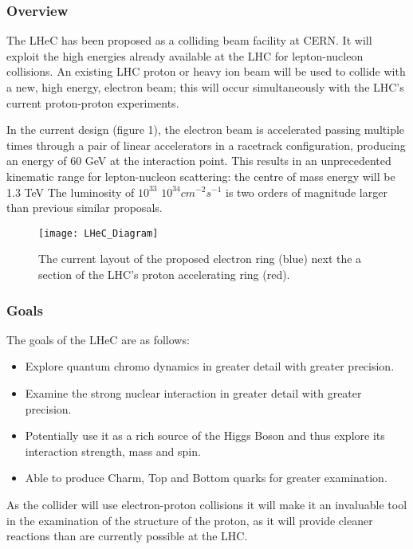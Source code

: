 \subsubsection{Overview \cite{LHeC:Birmingham}}

The LHeC has been proposed as a colliding beam facility at CERN. It will exploit the high energies already available at the LHC for lepton-nucleon collisions. An existing LHC proton or heavy ion beam will be used to collide with a new, high energy, electron beam; this will occur simultaneously with the LHC’s current proton-proton experiments.
 
In the current design (figure 1), the electron beam is accelerated passing multiple times through a pair of linear accelerators in a racetrack configuration, producing an energy of 60 GeV at the interaction point. This results in an unprecedented kinematic range for lepton-nucleon scattering: the centre of mass energy will be 1.3 TeV The luminosity of $10^{33}$ \textemdash $10^{34} cm^{-2}s^{-1}$ is two orders of magnitude larger than previous similar proposals.

\begin{figure}[!htb]
\centering
\texttt{[image: LHeC\_Diagram]}
\caption{The current layout of the proposed electron ring (blue) next the a section of the LHC’s proton accelerating ring (red).
}
\end{figure}

\subsubsection{Goals}

The goals of the LHeC are as follows:
\begin{itemize}
\item Explore quantum chromo dynamics in greater detail with greater precision.
\item Examine the strong nuclear interaction in greater detail with greater precision.
\item Potentially use it as a rich source of the Higgs Boson and thus explore its interaction strength, mass and spin.
\item Able to produce Charm, Top and Bottom quarks for greater examination.
\end{itemize}
As the collider will use electron-proton collisions it will make it an invaluable tool in the examination of the structure of the proton, as it will provide cleaner reactions than are currently possible at the LHC.
 

